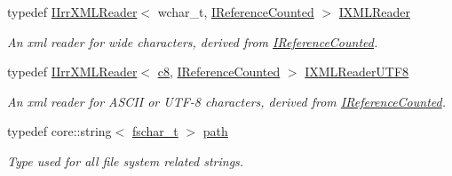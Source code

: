 \begin{DoxyCompactItemize}
typedef \hyperlink{classirr_1_1io_1_1IIrrXMLReader}{I\+Irr\+X\+M\+L\+Reader}$<$ wchar\+\_\+t, \hyperlink{classirr_1_1IReferenceCounted}{I\+Reference\+Counted} $>$ \hyperlink{namespaceirr_1_1io_ab620b13630f0818f3eefc000f6917fe4}{I\+X\+M\+L\+Reader}
\begin{DoxyCompactList}\small\item\em An xml reader for wide characters, derived from \hyperlink{classirr_1_1IReferenceCounted}{I\+Reference\+Counted}. \end{DoxyCompactList}\item 
typedef \hyperlink{classirr_1_1io_1_1IIrrXMLReader}{I\+Irr\+X\+M\+L\+Reader}$<$ \hyperlink{namespaceirr_a9395eaea339bcb546b319e9c96bf7410}{c8}, \hyperlink{classirr_1_1IReferenceCounted}{I\+Reference\+Counted} $>$ \hyperlink{namespaceirr_1_1io_a87616ca0bcc3d6424d2c2edfcb743193}{I\+X\+M\+L\+Reader\+U\+T\+F8}
\begin{DoxyCompactList}\small\item\em An xml reader for A\+S\+C\+II or U\+T\+F-\/8 characters, derived from \hyperlink{classirr_1_1IReferenceCounted}{I\+Reference\+Counted}. \end{DoxyCompactList}\item 
typedef core\+::string$<$ \hyperlink{namespaceirr_a813cca9bac9fa0c1427d89720a451460}{fschar\+\_\+t} $>$ \hyperlink{namespaceirr_1_1io_a6468281622ce3a1c46b72e19f32dded5}{path}
\begin{DoxyCompactList}\small\item\em Type used for all file system related strings. \end{DoxyCompactList}\end{DoxyCompactItemize}
